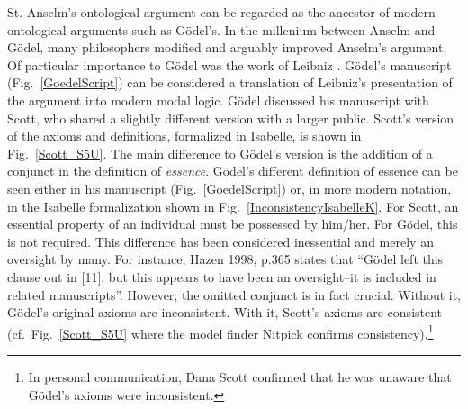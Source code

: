 \documentclass{article}
\begin{document}
St. Anselm's ontological argument \cite{Proslogion} can be regarded as
the ancestor of modern ontological arguments such as G\"odel's. In the
millenium between Anselm and G\"odel, many philosophers modified and
arguably improved Anselm's argument. Of particular importance to
G\"odel was the work of Leibniz \cite{ToDo:Leibniz}.  G\"odel's manuscript
(Fig.~\ref{GoedelScript}) can be considered a translation of Leibniz's
presentation of the argument into modern modal logic. G\"odel
discussed his manuscript with Scott, who shared a slightly different
version with a larger public. Scott's version of the axioms and
definitions, formalized in Isabelle, is shown in
Fig.~\ref{Scott_S5U}. The main difference to G\"odel's version is the
addition of a conjunct in the definition of \emph{essence}. G\"odel's
different definition of essence can be seen either in his manuscript
(Fig.~\ref{GoedelScript}) or, in more modern notation, in the Isabelle
formalization shown in Fig.~\ref{InconsistencyIsabelleK}. For Scott,
an essential property of an individual must be possessed by
him/her. For G\"odel, this is not required. This difference has been
considered inessential and merely an oversight by many. For instance,
Hazen 1998, p.365 \cite[p.365]{Hazen} states that ``G\"odel left this
clause out in [11], but this appears to have been an oversight--it is
included in related manuscripts''. However, the omitted conjunct is in
fact crucial. Without it, G\"odel's original axioms are
inconsistent. With it, Scott's axioms are consistent (cf.~Fig.~\ref{Scott_S5U}
where the model finder Nitpick \cite{Nitpick} confirms consistency).\footnote{In
  personal communication, Dana Scott confirmed that he was unaware
  that G\"odel's axioms were inconsistent.}


\end{document}
